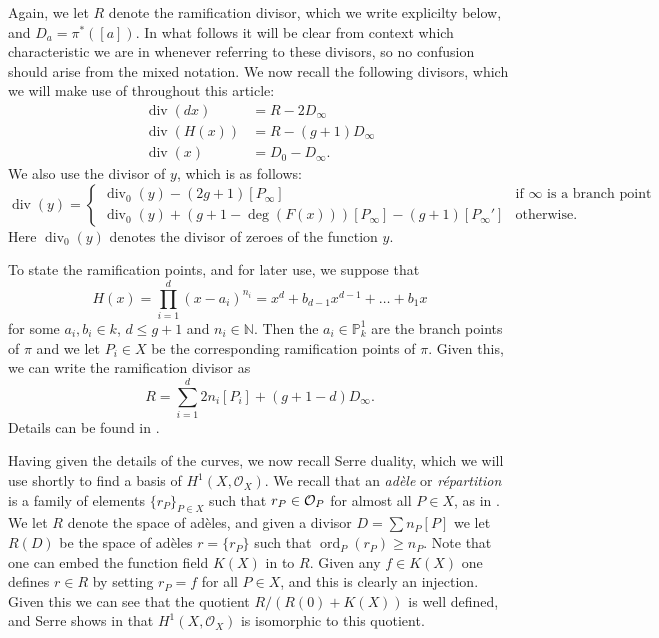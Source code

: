 \documentclass[draft, 11pt]{article} %
\theoremstyle{plain}
\theoremstyle{remark}
\newcommand{\cO}{{\cal O}}
\newcommand{\hone}{H^1(X,\mathcal{O}_X)}
\DeclareMathOperator{\ord}{ord}
\DeclareMathOperator{\di}{div}
\begin{document}
Again, we let $R$ denote the ramification divisor, which we write explicilty below, and $D_a = \pi^*([a])$.
In what follows it will be clear from context which characteristic we are in whenever referring to these divisors, so no confusion should arise from the mixed notation.
We now recall the following divisors, which we will make use of throughout this article:
\begin{align}
\di (dx) & = R - 2D_\infty \label{divdxp=2}\\
\di (H(x)) & = R - (g+1)D_\infty \label{divhp=2}\\
\di (x) & = D_0 - D_\infty \label{divxp=2}.
\end{align}
We also use the divisor of $y$, which is as follows:
\begin{equation}\label{divyp=2}
\di(y) = \begin{cases}
 \di_0(y) -(2g+1)[P_\infty] & \text{if $\infty$ is a branch point} \\
 \di_0(y) +(g+1-\deg(F(x)))[P_\infty] - (g+1)[P_\infty'] & \text{otherwise.}
\end{cases}
\end{equation}
Here $\di_0(y)$ denotes the divisor of zeroes of the function $y$.


To state the ramification points, and for later use, we suppose that 
\begin{equation}\label{hcoefficients}
H(x) = \prod_{i=1}^d (x-a_i)^{n_i} = x^d + b_{d-1}x^{d-1} + \ldots + b_1x
\end{equation}
for some $a_i, b_i \in  k$, $d \leq g+1$ and $n_i \in \mathbb N$.
Then the $a_i \in \mathbb P_k^1$ are the branch points of $\pi$ and we let $P_i \in X$ be the corresponding ramification points of $\pi$.
Given this, we can write the ramification divisor as
\[
R = \sum_{i=1}^d 2n_i[P_i] + (g+1-d)D_\infty.
\]
Details can be found in \cite[\S 6]{faithfulaction}.

Having given the details of the curves, we now recall Serre duality, which we will use shortly to find a basis of $\hone$.
We recall that an {\sl ad\`ele} or {\sl r\'epartition} is a family of elements $\{r_P\}_{P\in X}$ such that $r_P \in \cO_P$ for almost all $P\in X$, as in \cite[Chap. II, \S 5]{algebraicgroupsandclassfields}.
We let $R$ denote the space of ad\`eles, and given a divisor $D = \sum n_P[P]$ we let $R(D)$ be the space of ad\`eles $r = \{r_P\}$ such that $\ord_P(r_P) \geq n_P$.
Note that one can embed the function field $K(X)$ in to $R$.
Given any $f \in K(X)$ one defines $r \in R$ by setting $r_P = f$ for all $P \in X$, and this is clearly an injection.
Given this we can see that the quotient $R/(R(0) + K(X))$ is well defined, and Serre shows in \cite[Prop. 3, Chap II]{algebraicgroupsandclassfields} that $\hone$ is isomorphic to this quotient.
\end{document}
